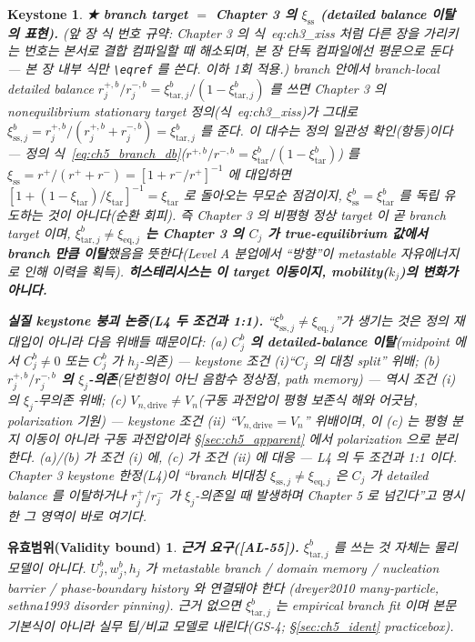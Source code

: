 \documentclass[11pt,a4paper]{article}
\newtheorem*{boundbox}{유효범위(Validity bound)}
\newtheorem*{keybox}{Keystone}
\newcommand{\eq}{\mathrm{eq}}
\newcommand{\drive}{\mathrm{drive}}
\newcommand{\tar}{\mathrm{tar}}
\newcommand{\sstat}{\mathrm{ss}}
\newcommand{\AL}[1]{\textsf{[AL-#1]}}
\begin{document}
\begin{keybox}
\textbf{★ branch target $=$ Chapter 3 의 $\xi_{\sstat}$ (detailed balance 이탈의 표현).} (\emph{앞 장 식 번호
규약}: Chapter 3 의 식~eq:ch3\_xiss 처럼 다른 장을 가리키는 번호는 본서로 결합 컴파일할 때 해소되며, 본 장 단독
컴파일에선 평문으로 둔다 — 본 장 내부 식만 \texttt{\textbackslash eqref} 를 쓴다. 이하 1회 적용.) branch 안에서 branch-local detailed
balance $r_j^{+,b}/r_j^{-,b}=\xi_{\tar,j}^b/(1-\xi_{\tar,j}^b)$ 를 쓰면 Chapter 3 의 nonequilibrium stationary
target 정의(식~eq:ch3\_xiss)가 그대로 $\xi_{\sstat,j}^b=r_j^{+,b}/(r_j^{+,b}+r_j^{-,b})=\xi_{\tar,j}^b$ 를 준다.
이 대수는 \emph{정의 일관성 확인(항등)}이다 — 정의 식~\eqref{eq:ch5_branch_db}($r^{+,b}/r^{-,b}=\xi_\tar^b/(1-\xi_\tar^b)$)
를 $\xi_{\sstat}=r^+/(r^++r^-)=[1+r^-/r^+]^{-1}$ 에 대입하면 $[1+(1-\xi_\tar)/\xi_\tar]^{-1}=\xi_\tar$ 로 돌아오는
\emph{무모순 점검}이지, $\xi_{\sstat}^b=\xi_\tar^b$ 를 독립 유도하는 것이 아니다(순환 회피). 즉 \emph{Chapter 3 의
비평형 정상 target 이 곧 branch target} 이며, \textbf{$\xi_{\tar,j}^b\ne\xi_{\eq,j}$ 는 Chapter 3 의 $C_j$ 가
true-equilibrium 값에서 branch 만큼 \emph{이탈}}했음을 뜻한다(Level A 분업에서 ``방향''이 metastable 자유에너지로
인해 이력을 획득). \textbf{히스테리시스는 이 \emph{target 이동}이지, mobility($k_j$)의 변화가 아니다.}

\textbf{실질 keystone 붕괴 논증(L4 두 조건과 1:1).} ``$\xi_{\sstat,j}^b\ne\xi_{\eq,j}$''가 생기는 것은 정의
재대입이 아니라 \emph{다음 위배}들 때문이다: (a) \textbf{$C_j^b$ 의 detailed-balance 이탈}(midpoint 에서 $C_j^b\ne0$
또는 $C_j^b$ 가 $h_j$-의존) — keystone 조건 (i)``$C_j$ 의 대칭 split'' 위배; (b) \textbf{$r_j^{+,b}/r_j^{-,b}$ 의
$\xi_j$-의존}(닫힌형이 아닌 음함수 정상점, path memory) — 역시 조건 (i) 의 $\xi_j$-무의존 위배; (c)
\textbf{$V_{n,\drive}\ne V_n$}(구동 과전압이 평형 보존식 해와 어긋남, polarization 기원) — keystone 조건 (ii)
``$V_{n,\drive}=V_n$'' 위배이며, 이 (c) 는 평형 분지 이동이 아니라 \emph{구동 과전압}이라 \S\ref{sec:ch5_apparent}
에서 polarization 으로 분리한다. (a)/(b) 가 조건 (i) 에, (c) 가 조건 (ii) 에 대응 — L4 의 두 조건과 1:1 이다.
Chapter 3 keystone 한정(L4)이 ``branch 비대칭 $\xi_{\sstat,j}\ne\xi_{\eq,j}$ 은 $C_j$ 가 detailed balance 를
이탈하거나 $r_j^+/r_j^-$ 가 $\xi_j$-의존일 때 발생하며 Chapter 5 로 넘긴다''고 명시한 그 영역이 바로 여기다.
\end{keybox}
\begin{boundbox}
\textbf{근거 요구(\AL{55}).} $\xi_{\tar,j}^b$ 를 쓰는 것 자체는 물리 모델이 아니다. $U_j^b,w_j^b,h_j$ 가
metastable branch / domain memory / nucleation barrier / phase-boundary history 와 연결돼야 한다
(dreyer2010 many-particle, sethna1993 disorder pinning). 근거 없으면 $\xi_{\tar,j}^b$ 는 empirical branch
fit 이며 본문 기본식이 아니라 실무 팁/비교 모델로 내린다(GS-4; \S\ref{sec:ch5_ident} practicebox).
\end{boundbox}
\end{document}
